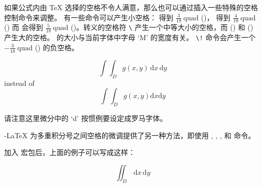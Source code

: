 
如果公式内由 \TeX{} 选择的空格不令人满意，那么也可以通过插入一些特殊的空格控制命令来调整。
有一些命令可以产生小空格：\ci{,} 得到 $\frac{3}{18}\:\textrm{quad}$
(\demowidth{0.166em})，\ci{:} 得到 $\frac{4}{18}\: \textrm{quad}$
(\demowidth{0.222em}) 而 \ci{;} 会得到 $\frac{5}{18}\:
\textrm{quad}$
(\demowidth{0.277em})。转义的空格符 \verb*.\. 产生一个中等大小的空格，而 
(\demowidth{1em}) 和 
(\demowidth{2em}) 产生大的空格。 的大小与当前字体中字母 `M' 的宽度有关。
 \verb|\!| 命令会产生一个 $-\frac{3}{18}\:\textrm{quad}$
(\demowidth{0.166em}) 的负空格。
\begin{example}
\newcommand{\ud}{\mathrm{d}}
\begin{displaymath}
\int\!\!\!\int_{D} g(x,y)
  \, \ud x\, \ud y
\end{displaymath}
instead of
\begin{displaymath}
\int\int_{D} g(x,y)\ud x \ud y
\end{displaymath}
\end{example}
%

请注意这里微分中的 `d' 按惯例要设定成罗马字体。

\AmS-\LaTeX{} 为多重积分号之间空格的微调提供了另一种方法，即使用 , , , 和  命令。

加入  宏包后，上面的例子可以写成这样：

\begin{example}
\newcommand{\ud}{\mathrm{d}}
\begin{displaymath}
\iint_{D} \, \ud x \, \ud y
\end{displaymath}
\end{example}

